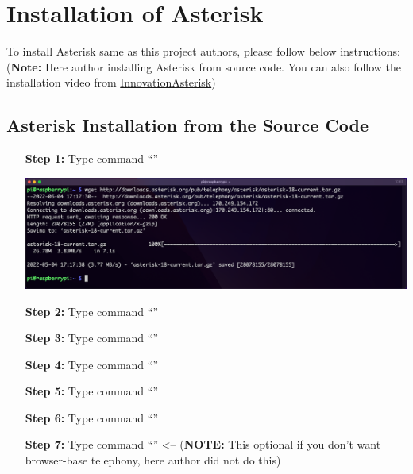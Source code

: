 \section{Installation of Asterisk}	\label{sec:run-asterisk}
	To install Asterisk same as this project authors, please follow below instructions: (\textbf{Note:} Here author installing Asterisk from source code. You can also follow the installation video from \href{https://www.youtube.com/watch?v=52sEPVPV9JE&list=PLruX0IBTg1G4Auvo5YhoJKgskmMP7b8bJ&index=4&ab_channel=InnovateAsterisk}{InnovationAsterisk})
	
	\subsection{Asterisk Installation from the Source Code}
		\begin{itemize}[leftmargin=1.7cm]
			\item[\textbf{Step 1:}] Type command ``{\selectfont{wget http://downloads.asterisk.org/pub/telephony/asterisk/asterisk-18-curren\\t.tar.gz}}''\\
				\begin{minipage}{\textwidth}
					\vspace{2mm}
					\includegraphics[scale=0.3]{Images/raspberry_pi/asterisk_install/wget.png}
					\vspace{2mm}
				\end{minipage}
			
			\item[\textbf{Step 2:}] Type command ``{\selectfont{sudo apt-get update}}''
			\item[\textbf{Step 3:}] Type command ``{\selectfont{sudo apt-get upgrade}}''
			\item[\textbf{Step 4:}] Type command ``{\selectfont{sudo apt-get install ntp}}''
			\item[\textbf{Step 5:}] Type command ``{\selectfont{sudo apt-get install speex speex* libspeex-dev libspeexdsp-dev}}''
			\item[\textbf{Step 6:}] Type command ``{\selectfont{sudo apt-get install libspeex-dev libspeexdsp-dev speex speex-doc}}''
			\item[\textbf{Step 7:}] Type command ``{\selectfont{sudo apt-get install xmlstarlet libopus-dev libopusfile-dev}}'' <-- (\textbf{NOTE:} This optional if you don't want browser-base telephony, here author did not do this)
			

\end{itemize}
